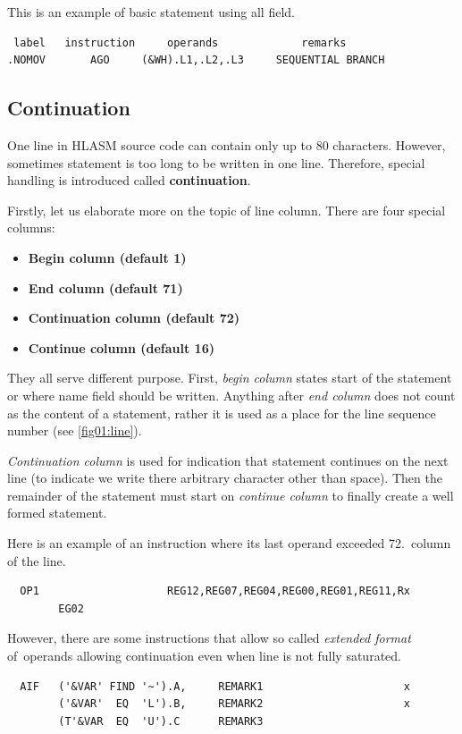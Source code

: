 This is an example of basic statement using all field.
\begin{verbatim}
 label   instruction     operands             remarks
.NOMOV       AGO     (&WH).L1,.L2,.L3     SEQUENTIAL BRANCH
\end{verbatim}

\subsection{Continuation}

One line in HLASM source code can contain only up to 80 characters. However, sometimes statement is too long to be written in one line. Therefore, special handling is introduced called \textbf{continuation}.

Firstly, let us elaborate more on the topic of line column. There are four special columns:
\begin{itemize}
	\item \textbf{Begin column (default 1)}
	
	\item \textbf{End column (default 71)}
	
	\item \textbf{Continuation column (default 72)}
	
	\item \textbf{Continue column (default 16)}
\end{itemize}
They all serve different purpose. First, \textit{begin column} states start of the statement or where name field should be written. Anything after \textit{end column} does not count as the content of a statement, rather it is used as a place for the line sequence number (see \ref{fig01:line}). 

\textit{Continuation column} is used for indication that statement continues on the next line (to indicate we write there arbitrary character other than space). Then the remainder of the statement must start on \textit{continue column} to finally create a well formed statement.

Here is an example of an instruction where its last operand exceeded 72.~column of the line.
\begin{verbatim}
  OP1                    REG12,REG07,REG04,REG00,REG01,REG11,Rx
        EG02
\end{verbatim} 
However, there are some instructions that allow so called \textit{extended format} of~operands allowing continuation even when line is not fully saturated.
\begin{verbatim}
  AIF   ('&VAR' FIND '~').A,     REMARK1                      x
        ('&VAR'  EQ  'L').B,     REMARK2                      x
        (T'&VAR  EQ  'U').C      REMARK3 
\end{verbatim} 

